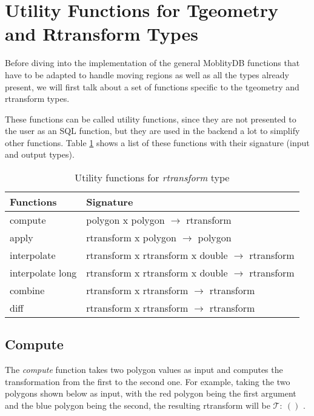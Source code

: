 
\newpage

\section{Utility Functions for Tgeometry and Rtransform Types}
\label{section:utility_rtransform}

Before diving into the implementation of the general MoblityDB functions that have to be adapted to handle moving regions as well as all the types already present, we will first talk about a set of functions specific to the tgeometry and rtransform types.

These functions can be called utility functions, since they are not presented to the user as an SQL function, but they are used in the backend a lot to simplify other functions. Table \ref{table:rtransform_functions} shows a list of these functions with their signature (input and output types).

\begin{table}[h!]
    \centering
    \begin{tabular}[c]{|l|l|} 
    \hline
    \textbf{Functions}  & \textbf{Signature} \\ 
    \hline
    compute             & polygon    x polygon              $\rightarrow$ rtransform \\
    apply               & rtransform x polygon              $\rightarrow$ polygon \\
    \hline
    interpolate         & rtransform x rtransform x double  $\rightarrow$ rtransform \\
    interpolate long    & rtransform x rtransform x double  $\rightarrow$ rtransform \\
    \hline
    combine             & rtransform x rtransform           $\rightarrow$ rtransform \\
    diff                & rtransform x rtransform           $\rightarrow$ rtransform \\
    \hline
    \end{tabular}
    \caption{Utility functions for \textit{rtransform} type}
    \label{table:rtransform_functions}
\end{table}

\subsection{Compute}
\label{section:compute}

The \textit{compute} function takes two polygon values as input and computes the transformation from the first to the second one. For example, taking the two polygons shown below as input, with the red polygon being the first argument and the blue polygon being the second, the resulting rtransform will be $\mathcal{T}:\ ()$ .

